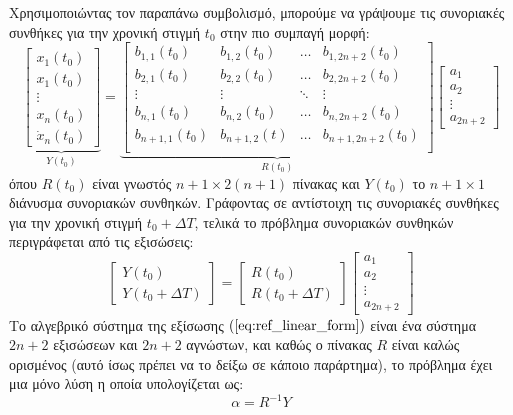 Χρησιμοποιώντας τον παραπάνω συμβολισμό, μπορούμε να γράψουμε τις συνοριακές συνθήκες για την χρονική στιγμή $t_0$ στην πιο συμπαγή μορφή:
\begin{equation*}
	\underbrace{
	\begin{bmatrix} x_1(t_0) \\ x_1(t_0) \\ \vdots \\ x_n(t_0) \\ \dot{x}_n(t_0)
	\end{bmatrix}}_{Y(t_0)}
	= 
	\underbrace{
	\begin{bmatrix} 
	b_{1,1}(t_0)   & b_{1,2}(t_0)   & \dots  & b_{1,2n+2}(t_0)   \\
	b_{2,1}(t_0)   & b_{2,2}(t_0)   & \dots  & b_{2,2n+2}(t_0)   \\
	\vdots       & \vdots       & \ddots & \vdots          \\
	b_{n,1}(t_0)   & b_{n,2}(t_0)   & \dots  & b_{n,2n+2}(t_0)   \\
	b_{n+1,1}(t_0) & b_{n+1,2}(t) & \dots  & b_{n+1,2n+2}(t_0) \\
	\end{bmatrix}
	}_{R(t_0)}
	\begin{bmatrix} a_1 \\ a_2 \\ \vdots \\ a_{2n+2}
	\end{bmatrix}
\end{equation*}
όπου $R(t_0)$ είναι γνωστός $n+1 \times 2(n+1)$ πίνακας και $Y(t_0)$ το $n+1 \times 1$ διάνυσμα συνοριακών συνθηκών. Γράφοντας σε  αντίστοιχη τις συνοριακές συνθήκες για την χρονική στιγμή $t_0+\Delta T$, τελικά το πρόβλημα συνοριακών συνθηκών περιγράφεται από τις εξισώσεις:
\begin{equation}
	\begin{bmatrix} Y(t_0) \\ Y(t_0 + \Delta T)
	\end{bmatrix} = 
	\begin{bmatrix}
	R(t_0) \\ R(t_0+\Delta T)
	\end{bmatrix}  \begin{bmatrix} a_1 \\ a_2 \\ \vdots \\ a_{2n+2}
	\end{bmatrix}
	\label{eq:ref_linear_form}
\end{equation}
Το αλγεβρικό σύστημα της εξίσωσης $(\ref{eq:ref_linear_form})$ είναι ένα σύστημα $2n+2$ εξισώσεων και $2n+2$ αγνώστων, και καθώς ο πίνακας $R$ είναι καλώς ορισμένος (αυτό ίσως πρέπει να το δείξω σε κάποιο παράρτημα), το πρόβλημα έχει μια μόνο λύση η οποία υπολογίζεται ως:
\begin{equation}
	\alpha = R^{-1} Y
	\label{eq:ref_system_inv_solution}
\end{equation}

